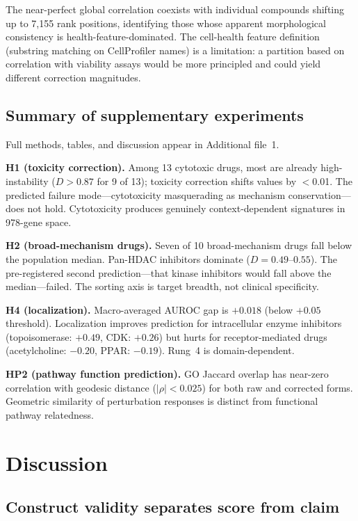 \documentclass[11pt]{article}
\begin{document}
The near-perfect global correlation coexists with individual compounds
shifting up to 7{,}155 rank positions, identifying those whose apparent
morphological consistency is health-feature-dominated. The cell-health feature
definition (substring matching on CellProfiler names) is a limitation:
a partition based on correlation with viability assays would be more
principled and could yield different correction magnitudes.

\subsection{Summary of supplementary experiments}

Full methods, tables, and discussion appear in Additional file~1.

\textbf{H1 (toxicity correction).} Among 13 cytotoxic drugs, most are already high-instability ($D > 0.87$
for 9 of 13); toxicity correction shifts values by $<$0.01. The predicted
failure mode---cytotoxicity masquerading as mechanism conservation---does
not hold. Cytotoxicity produces genuinely context-dependent signatures in
978-gene space.

\textbf{H2 (broad-mechanism drugs).} Seven of 10 broad-mechanism drugs fall below the population median.
Pan-HDAC inhibitors dominate ($D = 0.49$--$0.55$). The pre-registered
second prediction---that kinase inhibitors would fall above the
median---failed. The sorting axis is target breadth, not clinical
specificity.

\textbf{H4 (localization).} Macro-averaged AUROC gap is $+0.018$ (below $+0.05$ threshold). Localization
improves prediction for intracellular enzyme inhibitors (topoisomerase:
$+0.49$, CDK: $+0.26$) but hurts for receptor-mediated drugs
(acetylcholine: $-0.20$, PPAR: $-0.19$). Rung~4 is domain-dependent.

\textbf{HP2 (pathway function prediction).} GO Jaccard overlap has near-zero correlation with geodesic distance
($|\rho| < 0.025$) for both raw and corrected forms. Geometric similarity
of perturbation responses is distinct from functional pathway relatedness.

\section{Discussion}

\subsection{Construct validity separates score from claim}
\end{document}
